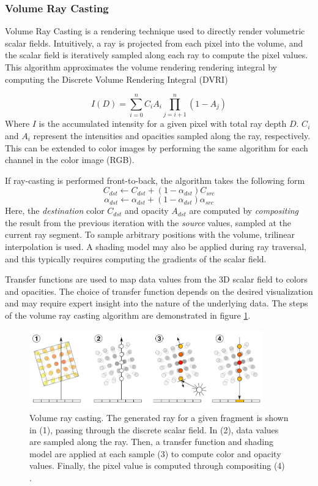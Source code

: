 \documentclass{article}
\begin{document}
\subsubsection{Volume Ray Casting}
Volume Ray Casting is a rendering technique used to directly render volumetric scalar fields.
Intuitively, a ray is projected from each pixel into the volume,
and the scalar field is iteratively sampled along each ray to compute the pixel values.
This algorithm approximates the volume rendering rendering integral by computing the Discrete Volume Rendering Integral (DVRI) 

$$ I(D) = \sum_{i=0}^n C_iA_i\prod_{j=i+1}^{n}(1-A_j)$$
Where $I$ is the accumulated intensity for a given pixel with total ray depth $D$.
$C_i$ and $A_i$ represent the intensities and opacities sampled along the ray, respectively. This
can be extended to color images by performing the same algorithm for each channel in the color image (RGB).

If ray-casting is performed front-to-back, the algorithm takes the following form \cite{Kruger2006GPU}
$$ C_{dst} \leftarrow C_{dst} + (1-\alpha_{dst})C_{src} $$
$$ \alpha_{dst} \leftarrow \alpha_{dst} + (1-\alpha_{dst})\alpha_{src}$$
Here, the \textit{destination} color $C_{dst}$ and opacity $A_{dst}$ are computed by 
\textit{compositing} the result from the previous iteration with the \textit{source} values, sampled at the current ray segment. To sample arbitrary positions with the volume, trilinear interpolation is used. A shading model may also be applied during ray traversal,
and this typically requires computing the gradients of the scalar field.

Transfer functions are used to map data values from the 3D scalar field to colors and opacities. The choice of transfer function
depends on the desired visualization and may require expert insight into the nature of the underlying data.
The steps of the volume ray casting algorithm are demonstrated in figure \ref{fig:volumeRayCasting}.


\begin{figure}[tbh]
    \centering
    \includegraphics[width=0.9\textwidth]{images/Volume_ray_casting.png}
    \caption{Volume ray casting. The generated ray for a given fragment is shown in (1), passing through the discrete scalar field. In (2), data values are sampled along the ray. Then, a transfer function and shading model are applied at each sample (3) to compute color and opacity values. Finally, the pixel value
    is computed through compositing (4) \cite{Hofmann2011}.}
    \label{fig:volumeRayCasting}
\end{figure}
\end{document}
